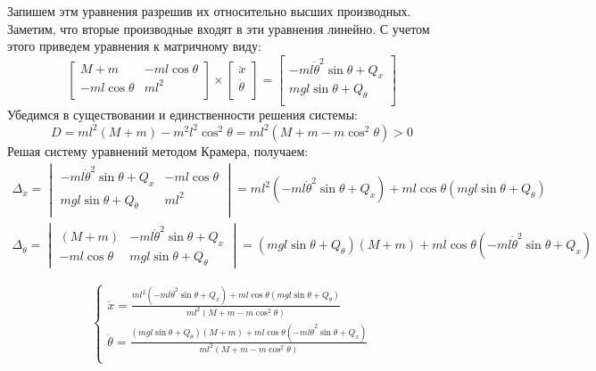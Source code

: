 Запишем этм уравнения разрешив их относительно высших производных. Заметим, что вторые производные 
входят в эти уравнения линейно. С учетом этого приведем уравнения к матричному виду:  %
\begin{equation}
    \begin{bmatrix}
        M + m &  -ml\cos\theta \\
        -ml\cos\theta & ml^2 \\ 
    \end{bmatrix} \times
    \begin{bmatrix}
        \ddot{x} \\
        \ddot{\theta} \\
    \end{bmatrix} =
    \begin{bmatrix}
        -ml\dot{\theta}^2\sin\theta + Q_x \\ 
        mgl\sin\theta + Q_{\theta} \\
    \end{bmatrix}
\end{equation}
Убедимся в существовании и единственности решения системы:
\begin{equation}
    D = ml^2(M + m) - m^2l^2\cos^2\theta = ml^2(M + m - m\cos^2\theta) > 0
\end{equation}
Решая систему уравнений методом Крамера, получаем:
\begin{multline}
    \Delta_{\ddot{x}} = \begin{vmatrix}
        -ml\dot{\theta}^2\sin\theta + Q_x & -ml\cos\theta \\
        mgl\sin\theta + Q_{\theta} & ml^2 \\
    \end{vmatrix} = ml^2(-ml\dot{\theta}^2\sin\theta + Q_x) + ml\cos\theta(mgl\sin\theta + Q_{\theta}) 
\end{multline}
\begin{multline}
    \Delta_{\ddot{\theta}} = \begin{vmatrix}
        (M + m) & -ml\dot{\theta}^2\sin\theta + Q_x \\ 
        -ml\cos\theta & mgl\sin\theta + Q_{\theta} 
    \end{vmatrix} = (mgl\sin\theta + Q_{\theta})(M + m) + ml\cos\theta(-ml\dot{\theta}^2\sin\theta + Q_x) 
\end{multline}

\begin{equation}
    \begin{cases}
        \ddot{x} = \frac{ml^2(-ml\dot{\theta}^2\sin\theta + Q_x) + ml\cos\theta(mgl\sin\theta + Q_{\theta}) }{ml^2(M + m - m\cos^2\theta)} \\ 
        \ddot{\theta} = \frac{(mgl\sin\theta + Q_{\theta})(M + m) + ml\cos\theta(-ml\dot{\theta}^2\sin\theta + Q_x) }{ml^2(M + m - m\cos^2\theta)} \\ 
    \end{cases}
    \label{eq:nonlinear_model}
\end{equation}

